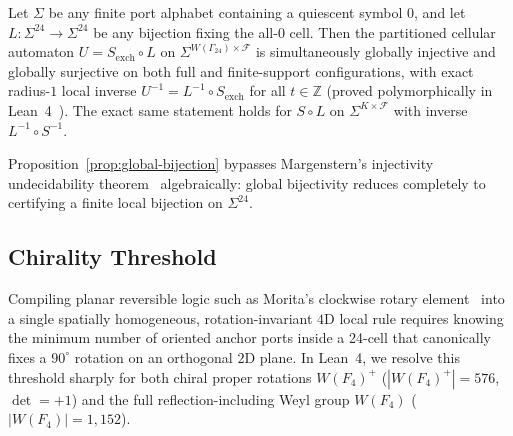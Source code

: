 \begin{proposition}
\label{prop:global-bijection}
Let $\Sigma$ be any finite port alphabet containing a quiescent symbol $0$, and let $L : \Sigma^{24} \to \Sigma^{24}$ be any bijection fixing the all-$0$ cell. Then the partitioned cellular automaton $U = S_{\mathrm{exch}} \circ L$ on $\Sigma^{W(\Gamma_{24}) \times \mathcal{F}}$ is simultaneously globally injective and globally surjective on both full and finite-support configurations, with exact radius-$1$ local inverse $U^{-1} = L^{-1} \circ S_{\mathrm{exch}}$ for all $t \in \mathbb{Z}$ (proved polymorphically in Lean~4~\cite{pollard2026repo}). The exact same statement holds for $S \circ L$ on $\Sigma^{K \times \mathcal{F}}$ with inverse $L^{-1} \circ S^{-1}$.
\end{proposition}

Proposition~\ref{prop:global-bijection} bypasses Margenstern's injectivity undecidability theorem~\cite{margenstern2008injectivity} algebraically: global bijectivity reduces completely to certifying a finite local bijection on $\Sigma^{24}$.

\subsection{Chirality Threshold}
\label{subsec:chirality-threshold}

Compiling planar reversible logic such as Morita's clockwise rotary element~\cite{morita2001} into a single spatially homogeneous, rotation-invariant $4\mathrm{D}$ local rule requires knowing the minimum number of oriented anchor ports inside a 24-cell that canonically fixes a $90^\circ$ rotation on an orthogonal $2\mathrm{D}$ plane. In Lean~4, we resolve this threshold sharply for both chiral proper rotations $W(F_4)^+$ ($|W(F_4)^+| = 576$, $\det = +1$) and the full reflection-including Weyl group $W(F_4)$ ($|W(F_4)| = 1{,}152$).

